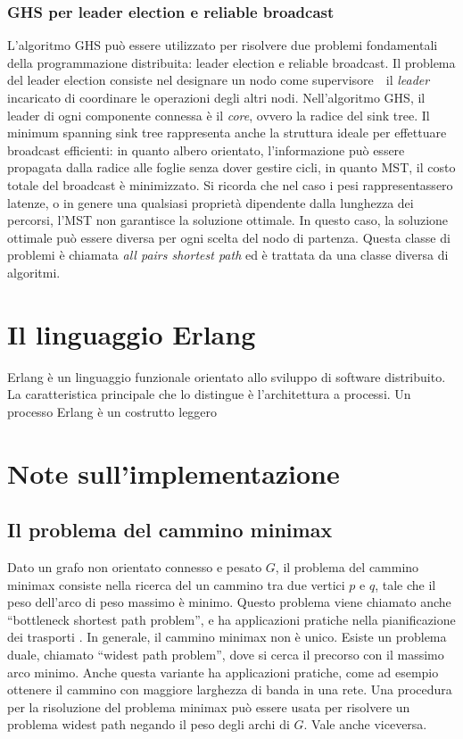\documentclass[target=bach,aauheader=,style=]{thud}
\newcommand{\eng}[1]{\foreignlanguage{english}{#1}}
\begin{document}
\subsection{GHS per leader \eng{election} e \eng{reliable broadcast}}
L'algoritmo GHS può essere utilizzato per risolvere due problemi fondamentali della programmazione distribuita: leader \eng{election} e \eng{reliable broadcast}. Il problema del leader \eng{election} consiste nel designare un nodo come supervisore \,\textendash\, il \emph{leader} \,\textendash\, incaricato di coordinare le operazioni degli altri nodi. Nell'algoritmo GHS, il leader di ogni componente connessa è il \emph{core}, ovvero la radice del \eng{sink tree}. Il \eng{minimum spanning sink tree} rappresenta anche la struttura ideale per effettuare \eng{broadcast} efficienti: in quanto albero orientato, l'informazione può essere propagata dalla radice alle foglie senza dover gestire cicli, in quanto MST, il costo totale del \eng{broadcast} è minimizzato. Si ricorda che nel caso i pesi rappresentassero latenze, o in genere una qualsiasi proprietà dipendente dalla lunghezza dei percorsi, l'MST non garantisce la soluzione ottimale. In questo caso, la soluzione ottimale può essere diversa per ogni scelta del nodo di partenza. Questa classe di problemi è chiamata \eng{\emph{all pairs shortest path}} ed è trattata da una classe diversa di algoritmi.


\chapter{Il linguaggio Erlang}

Erlang è un linguaggio funzionale orientato allo sviluppo di software distribuito. La caratteristica principale che lo distingue è l'architettura a processi. Un processo Erlang è un costrutto leggero 

\chapter{Note sull'implementazione}

\section{Il problema del cammino minimax}

Dato un grafo non orientato connesso e pesato $G$, il problema del cammino minimax consiste nella ricerca del un cammino tra due vertici $p$ e $q$, tale che il peso dell'arco di peso massimo è minimo. Questo problema viene chiamato anche ``\eng{bottleneck shortest path problem}'', e ha applicazioni pratiche nella pianificazione dei trasporti \cite{doi:10.1287/trsc.21.2.115}. In generale, il cammino minimax non è unico. Esiste un problema duale, chiamato ``\eng{widest path problem}'', dove si cerca il precorso con il massimo arco minimo. Anche questa variante ha applicazioni pratiche, come ad esempio ottenere il cammino con maggiore larghezza di banda in una rete. Una procedura per la risoluzione del problema minimax può essere usata per risolvere un problema \eng{widest path} negando il peso degli archi di $G$. Vale anche viceversa.
\end{document}
